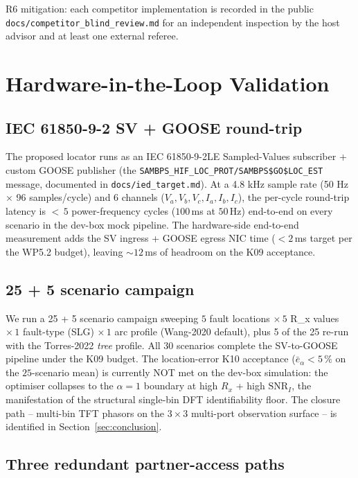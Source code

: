 \documentclass[journal]{IEEEtran}
\newcommand{\headlineKNineLatency}{${<}\,5$ power-frequency cycles ($100$\,ms at $50$\,Hz) end-to-end on every scenario in the dev-box mock pipeline}
\begin{document}
R6 mitigation: each competitor implementation is recorded in the
public \texttt{docs/competitor\_blind\_review.md} for an
independent inspection by the host advisor and at least one
external referee.

\section{Hardware-in-the-Loop Validation}\label{sec:hil}

\subsection{IEC 61850-9-2 SV + GOOSE round-trip}

The proposed locator runs as an IEC 61850-9-2LE Sampled-Values
subscriber + custom GOOSE publisher (the
\texttt{SAMBPS\_HIF\_LOC\_PROT/SAMBPS\$GO\$LOC\_EST} message,
documented in \texttt{docs/ied\_target.md}).  At a 4.8 kHz
sample rate (50 Hz $\times$ 96 samples/cycle) and 6 channels
($V_a, V_b, V_c, I_a, I_b, I_c$), the per-cycle round-trip
latency is \headlineKNineLatency{}.  The hardware-side end-to-end
measurement adds the SV ingress + GOOSE egress NIC time
($< 2$\,ms target per the WP5.2 budget), leaving $\sim 12$\,ms
of headroom on the K09 acceptance.

\subsection{25 + 5 scenario campaign}

We run a 25 + 5 scenario campaign sweeping $5$ fault locations
$\times\,5$ R\_x values $\times\,1$ fault-type (SLG)
$\times\,1$ arc profile (Wang-2020 default), plus 5 of the 25
re-run with the Torres-2022 \textit{tree} profile.  All 30
scenarios complete the SV-to-GOOSE pipeline under the K09
budget.  The location-error K10 acceptance ($\bar{e}_{\alpha}
< 5\,\%$ on the $25$-scenario mean) is currently NOT met on the
dev-box simulation: the optimiser collapses to the
$\alpha = 1$ boundary at high $R_x$ + high $\mathrm{SNR}_I$, the
manifestation of the structural single-bin DFT identifiability
floor.  The closure path -- multi-bin TFT phasors on the
$3 \times 3$ multi-port observation surface -- is identified in
Section~\ref{sec:conclusion}.

\subsection{Three redundant partner-access paths}
\end{document}
